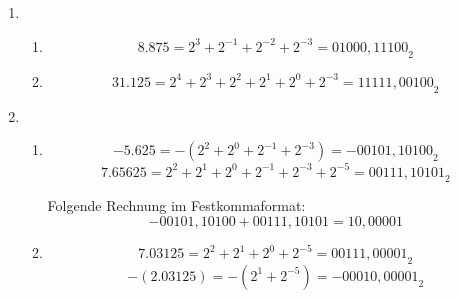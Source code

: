 \documentclass[DIN, pagenumber=false, fontsize=11pt, parskip=half]{scrartcl}
\begin{document}
    \subsection{}
    \begin{enumerate}[label=(\alph*)]
        \item 
            \begin{enumerate}[label=(\roman*)]
                \item 
                    \begin{equation*}
                        8.875 = 2^3 + 2^{-1} + 2^{-2} + 2^{-3} = {01000,11100}_2
                    \end{equation*}
                \item
                    \begin{equation*}
                        31.125 = 2^4 + 2^3 + 2^2 + 2^1  + 2^0 + 2^{-3} = {11111,00100}_2
                    \end{equation*}
            \end{enumerate}
        \item 
            \begin{enumerate}[label=(\roman*)]
                \item
                    \begin{equation*}
                        -5.625 = -(2^2 + 2^0 + 2^{-1} + 2^{-3}) = {-00101,10100}_2
                    \end{equation*}
                    \begin{equation*}
                        7.65625 = 2^2 + 2^1 + 2^0 +2^{-1} + 2^{-3} + 2^{-5} = {00111,10101}_2
                    \end{equation*}

                    Folgende Rechnung im Festkommaformat:
                    \begin{equation*}
                        -00101,10100 + 00111,10101 = 10,00001
                    \end{equation*}
                \item
                    \begin{equation*}
                        7.03125 = 2^2 + 2^1 + 2^0 + 2^{-5} = {00111,00001}_2
                    \end{equation*}
                    \begin{equation*}
                        -(2.03125) = -(2^1 + 2^{-5}) = -{00010,00001}_2
                    \end{equation*}
                    

\end{enumerate}
\end{enumerate}
\end{document}
